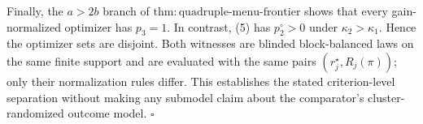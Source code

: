 Finally, the \(a>2b\) branch of \(\mathrm{thm:quadruple\text{-}menu\text{-}frontier}\) shows that every gain-normalized optimizer has \(p_3=1\). In contrast, (5) has \(p_2^\circ>0\) under \(\kappa_2>\kappa_1\). Hence the optimizer sets are disjoint. Both witnesses are blinded block-balanced laws on the same finite support and are evaluated with the same pairs \((r_j^\star,R_j(\pi))\); only their normalization rules differ. This establishes the stated criterion-level separation without making any submodel claim about the comparator's cluster-randomized outcome model. \(\square\)